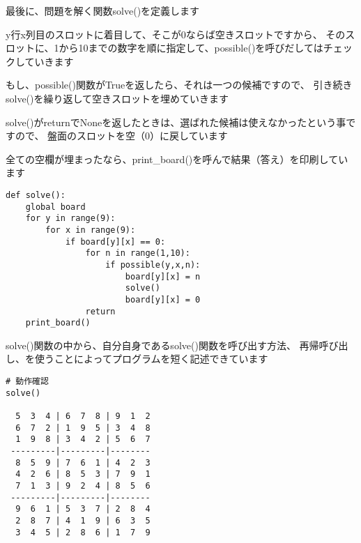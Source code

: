 \documentclass[uplatex,a4paper,11pt,oneside,openany]{jsbook}
\begin{document}
最後に、問題を解く関数solve()を定義します

y行x列目のスロットに着目して、そこが0ならば空きスロットですから、
そのスロットに、1から10までの数字を順に指定して、possible()を呼びだしてはチェックしていきます

もし、possible()関数がTrueを返したら、それは一つの候補ですので、
引き続きsolve()を繰り返して空きスロットを埋めていきます

solve()がreturnでNoneを返したときは、選ばれた候補は使えなかったという事ですので、
盤面のスロットを空（0）に戻しています

全ての空欄が埋まったなら、print\_board()を呼んで結果（答え）を印刷しています

\begin{lstlisting}[caption=solve,label=sudoku03]
def solve():
    global board
    for y in range(9):
        for x in range(9):
            if board[y][x] == 0:
                for n in range(1,10):
                    if possible(y,x,n):
                        board[y][x] = n
                        solve()
                        board[y][x] = 0
                return
    print_board()

\end{lstlisting}

solve()関数の中から、自分自身であるsolve()関数を呼び出す方法、
再帰呼び出し、を使うことによってプログラムを短く記述できています

\begin{verbatim}
# 動作確認
solve()

  5  3  4 | 6  7  8 | 9  1  2
  6  7  2 | 1  9  5 | 3  4  8
  1  9  8 | 3  4  2 | 5  6  7
 ---------|---------|--------
  8  5  9 | 7  6  1 | 4  2  3
  4  2  6 | 8  5  3 | 7  9  1
  7  1  3 | 9  2  4 | 8  5  6
 ---------|---------|--------
  9  6  1 | 5  3  7 | 2  8  4
  2  8  7 | 4  1  9 | 6  3  5
  3  4  5 | 2  8  6 | 1  7  9
\end{verbatim}

%
\begin{thebibliography}{99}
\end{thebibliography}
%
\end{document}
